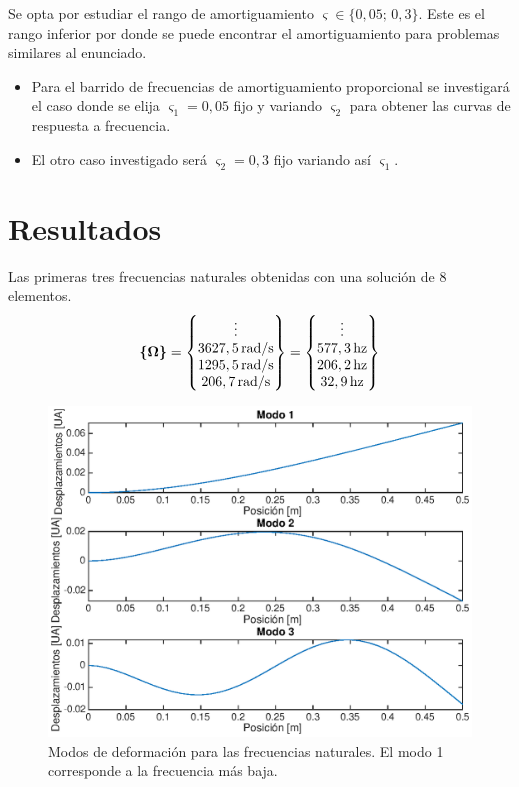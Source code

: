 \documentclass[onecolumn,10pt,titlepage,a4paper]{article}
\begin{document}
Se opta por estudiar el rango de amortiguamiento  $\varsigma\in \{0,05;\, 0,3\}$. Este es el rango inferior por donde se puede encontrar el amortiguamiento para problemas similares al enunciado.
\begin{itemize}
	\item Para el barrido de frecuencias de amortiguamiento proporcional se investigará el caso donde se elija $\varsigma_1=0,05$ fijo y variando $\varsigma_2$ para obtener las curvas de respuesta a frecuencia.
	\item El otro caso investigado será $\varsigma_2=0,3$ fijo variando así $\varsigma_1$.
\end{itemize}

\section{Resultados}
Las primeras tres frecuencias naturales obtenidas con una solución de 8 elementos.
\[
\Cme{\Omega} = \begin{Bmatrix}
\vdots \\
3627,5 \si{\, \radian \per \second}\\
1295,5 \si{\, \radian \per \second}\\
 206,7 \si{\, \radian \per \second}
\end{Bmatrix}=\begin{Bmatrix}
\vdots \\
577,3\, \textrm{hz}\\
206,2\, \textrm{hz}\\
32,9\, \textrm{hz} 
\end{Bmatrix}
\]

\begin{figure}[htb!] 
	\centering
	\includegraphics[width=1\textwidth]{fig/modos.eps}
	\caption{Modos de deformación para las frecuencias naturales. El modo 1 corresponde a la frecuencia más baja.}
	\label{fig:modos}
\end{figure}
\end{document}
